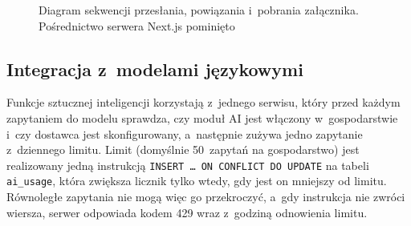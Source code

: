 \begin{figure}[H]
  \centering
  \caption{Diagram sekwencji przesłania, powiązania i~pobrania załącznika. Pośrednictwo serwera Next.js pominięto}
  \label{fig:sekwencja-zalacznik}
\end{figure}

\subsection{Integracja z~modelami językowymi}

Funkcje sztucznej inteligencji korzystają z~jednego serwisu, który przed każdym zapytaniem do modelu sprawdza, czy moduł AI jest włączony w~gospodarstwie i~czy dostawca jest skonfigurowany, a~następnie zużywa jedno zapytanie z~dziennego limitu. Limit (domyślnie 50~zapytań na gospodarstwo) jest realizowany jedną instrukcją \texttt{INSERT \dots{} ON CONFLICT DO UPDATE} na tabeli \texttt{ai\_usage}, która zwiększa licznik tylko wtedy, gdy jest on mniejszy od limitu. Równoległe zapytania nie mogą więc go przekroczyć, a~gdy instrukcja nie zwróci wiersza, serwer odpowiada kodem 429 wraz z~godziną odnowienia limitu.

